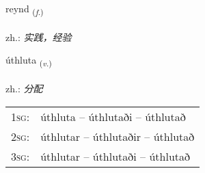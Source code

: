 \documentclass[frontgrid, backgrid]{flacards}\usepackage[]{graphicx}\usepackage[]{xcolor}
\begin{document}
\renewcommand{\flhead}{\vskip5pt \fboxsep=0pt {\small\bfseries\footnotesize Nafnorð | 名词}}
\renewcommand{\fcfoot}{\vskip5pt \fboxsep=0pt \hspace{2pt}{\small\bfseries\footnotesize 3K}}

\renewcommand{\blhead}{\vskip5pt {\small\bfseries\footnotesize Nafnorð | 名词 }}
\renewcommand{\bcfoot}{\vskip5pt \hspace{2pt}{\small\bfseries\footnotesize 3K}}


{reynd \small{\textsubscript{(\textit{f.})}} \\[1ex] %
\textphonetic{[reint]} \\
zh.: \emph{实践，经验} \\  [2ex]
\renewcommand*{\arraystretch}{0.8}
}

\renewcommand{\flhead}{\vskip5pt \fboxsep=0pt {\small\bfseries\footnotesize Sagnorð | 动词}}
\renewcommand{\fcfoot}{\vskip5pt \fboxsep=0pt \hspace{2pt}{\small\bfseries\footnotesize 3K}}

\renewcommand{\blhead}{\vskip5pt {\small\bfseries\footnotesize Sagnorð | 动词 }}
\renewcommand{\bcfoot}{\vskip5pt \hspace{2pt}{\small\bfseries\footnotesize 3K}}


{úthluta \small{\textsubscript{(\textit{v.})}} \\[1ex] %
 \\
zh.: \emph{分配} \\  [2ex]
\renewcommand*{\arraystretch}{0.8}
\begin{tabular}{p{1cm}l}
\textsc{1sg}: & úthluta -- úthlutaði -- úthlutað \\ 
\textsc{2sg}: & úthlutar -- úthlutaðir -- úthlutað \\ 
\textsc{3sg}: & úthlutar -- úthlutaði -- úthlutað \\ 
\end{tabular}
}
\end{document}

